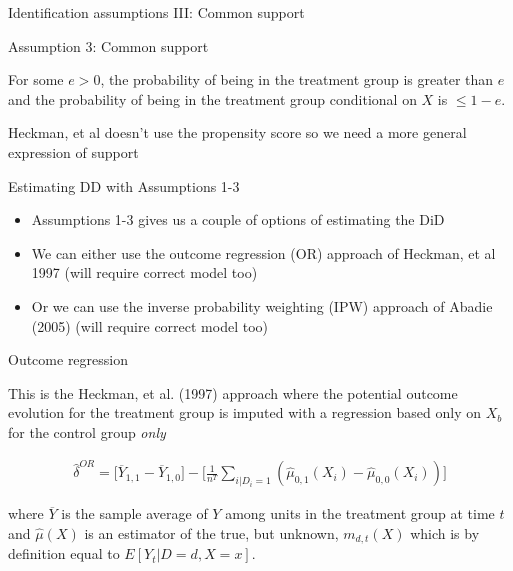 \documentclass{beamer}
\begin{document}
\begin{frame}{Identification assumptions III: Common support}

Assumption 3: Common support

\bigskip

For some $e>0$, the probability of being in the treatment group is greater than $e$ and the probability of being in the treatment group conditional on $X$ is $\leq1-e$.

\bigskip

Heckman, et al doesn't use the propensity score so we need a more general expression of support

\end{frame}

\begin{frame}{Estimating DD with Assumptions 1-3}

\begin{itemize}
\item Assumptions 1-3 gives us a couple of options of estimating the DiD
\item We can either use the outcome regression (OR) approach of Heckman, et al 1997 (will require correct model too)
\item Or we can use the inverse probability weighting (IPW) approach of Abadie (2005) (will require correct model too)
\end{itemize}

\end{frame}



\begin{frame}{Outcome regression}

This is the Heckman, et al. (1997) approach where the potential outcome evolution for the treatment group is imputed with a regression based only on $X_b$ for the control group \emph{only}

\bigskip

\begin{eqnarray*}
\widehat{\delta}^{OR} = \bigg [ \overline{Y}_{1,1} -  \overline{Y}_{1,0} \bigg ] -  \bigg [ \frac{1}{n^T} \sum_{i|D_i=1} ( \widehat{\mu}_{0,1}(X_i) - \widehat{\mu}_{0,0}(X_i)) \bigg ]
\end{eqnarray*}

where $\overline{Y}$ is the sample average of $Y$ among units in the treatment group at time $t$ and $\widehat{\mu}(X)$ is an estimator of the true, but unknown, $m_{d,t}(X)$ which is by definition equal to $E[Y_t|D=d,X=x]$.

\end{frame}
\end{document}
